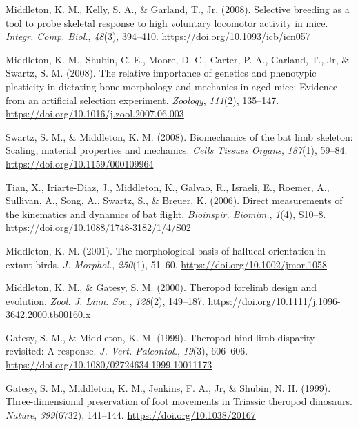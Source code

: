 \documentclass[11pt, a4paper]{awesome-cv}
\begin{document}
\leavevmode\hypertarget{ref-middleton_selective_2008a}{}%
Middleton, K. M., Kelly, S. A., \& Garland, T., Jr. (2008). Selective
breeding as a tool to probe skeletal response to high voluntary
locomotor activity in mice. \emph{Integr. Comp. Biol.}, \emph{48}(3),
394--410. \url{https://doi.org/10.1093/icb/icn057}

\leavevmode\hypertarget{ref-middleton_relative_2008}{}%
Middleton, K. M., Shubin, C. E., Moore, D. C., Carter, P. A., Garland,
T., Jr, \& Swartz, S. M. (2008). The relative importance of genetics and
phenotypic plasticity in dictating bone morphology and mechanics in aged
mice: Evidence from an artificial selection experiment. \emph{Zoology},
\emph{111}(2), 135--147.
\url{https://doi.org/10.1016/j.zool.2007.06.003}

\leavevmode\hypertarget{ref-swartz_biomechanics_2008}{}%
Swartz, S. M., \& Middleton, K. M. (2008). Biomechanics of the bat limb
skeleton: Scaling, material properties and mechanics. \emph{Cells
Tissues Organs}, \emph{187}(1), 59--84.
\url{https://doi.org/10.1159/000109964}

\leavevmode\hypertarget{ref-tian_direct_2006}{}%
Tian, X., Iriarte-Diaz, J., Middleton, K., Galvao, R., Israeli, E.,
Roemer, A., Sullivan, A., Song, A., Swartz, S., \& Breuer, K. (2006).
Direct measurements of the kinematics and dynamics of bat flight.
\emph{Bioinspir. Biomim.}, \emph{1}(4), S10--8.
\url{https://doi.org/10.1088/1748-3182/1/4/S02}

\leavevmode\hypertarget{ref-middleton_morphological_2001}{}%
Middleton, K. M. (2001). The morphological basis of hallucal orientation
in extant birds. \emph{J. Morphol.}, \emph{250}(1), 51--60.
\url{https://doi.org/10.1002/jmor.1058}

\leavevmode\hypertarget{ref-middleton_theropod_2000}{}%
Middleton, K. M., \& Gatesy, S. M. (2000). Theropod forelimb design and
evolution. \emph{Zool. J. Linn. Soc.}, \emph{128}(2), 149--187.
\url{https://doi.org/10.1111/j.1096-3642.2000.tb00160.x}

\leavevmode\hypertarget{ref-gatesy_theropod_1999}{}%
Gatesy, S. M., \& Middleton, K. M. (1999). Theropod hind limb disparity
revisited: A response. \emph{J. Vert. Paleontol.}, \emph{19}(3),
606--606. \url{https://doi.org/10.1080/02724634.1999.10011173}

\leavevmode\hypertarget{ref-gatesy_three-dimensional_1999}{}%
Gatesy, S. M., Middleton, K. M., Jenkins, F. A., Jr, \& Shubin, N. H.
(1999). Three-dimensional preservation of foot movements in Triassic
theropod dinosaurs. \emph{Nature}, \emph{399}(6732), 141--144.
\url{https://doi.org/10.1038/20167}
\end{document}
